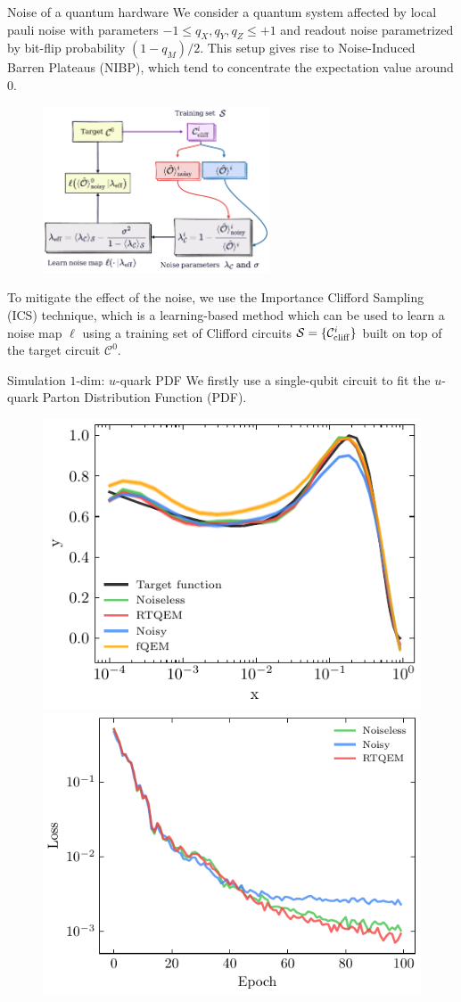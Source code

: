 \documentclass[20pt, final]{beamer}
\newlength{\colwidth}
\begin{document}
\begin{frame}[t]
\begin{columns}[t]
\begin{column}{\colwidth}
\begin{block}{Noise of a quantum hardware}
We consider a quantum system affected by local pauli noise with parameters 
$-1 \leq q_X, q_Y, q_Z \leq +1$ and readout noise parametrized by bit-flip probability 
$(1-q_M)/2$. This setup gives rise to Noise-Induced Barren Plateaus (NIBP), which tend 
to concentrate the expectation value around 0. 
    \begin{figure}
    \includegraphics[width=0.6\textwidth]{figures/ics.pdf}%
    \end{figure}
To mitigate the effect of the noise, we use the Importance Clifford Sampling (ICS)
technique, which is a learning-based method which can be used to learn a noise 
map $\ell$ using a training set of Clifford circuits $\mathcal{S}=\{\mathcal{C}^i_{\rm cliff}\}$
built on top of the target circuit $\mathcal{C}^0$.
\end{block}

\begin{block}{Simulation $1$-dim:  $u$-quark PDF}
We firstly use a single-qubit circuit to fit the $u$-quark Parton Distribution 
Function (PDF).
\begin{figure}
  \centering
    \includegraphics[width=0.5\linewidth]{figures/qpdf.pdf}%
    \includegraphics[width=0.5\linewidth]{figures/qpdf_loss.pdf}
    \label{fig:qpdf_simulation}
  \end{figure}
\end{block}


\end{column}
\end{columns}
\end{frame}
\end{document}
